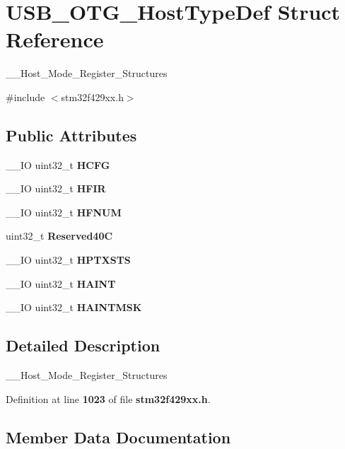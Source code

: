 \section{U\+S\+B\+\_\+\+O\+T\+G\+\_\+\+Host\+Type\+Def Struct Reference}
\label{structUSB__OTG__HostTypeDef}


\+\_\+\+\_\+\+Host\+\_\+\+Mode\+\_\+\+Register\+\_\+\+Structures  




{\ttfamily \#include $<$stm32f429xx.\+h$>$}

\subsection*{Public Attributes}
\begin{DoxyCompactItemize}
\item 
\+\_\+\+\_\+\+IO uint32\+\_\+t \textbf{ H\+C\+FG}
\item 
\+\_\+\+\_\+\+IO uint32\+\_\+t \textbf{ H\+F\+IR}
\item 
\+\_\+\+\_\+\+IO uint32\+\_\+t \textbf{ H\+F\+N\+UM}
\item 
uint32\+\_\+t \textbf{ Reserved40C}
\item 
\+\_\+\+\_\+\+IO uint32\+\_\+t \textbf{ H\+P\+T\+X\+S\+TS}
\item 
\+\_\+\+\_\+\+IO uint32\+\_\+t \textbf{ H\+A\+I\+NT}
\item 
\+\_\+\+\_\+\+IO uint32\+\_\+t \textbf{ H\+A\+I\+N\+T\+M\+SK}
\end{DoxyCompactItemize}


\subsection{Detailed Description}
\+\_\+\+\_\+\+Host\+\_\+\+Mode\+\_\+\+Register\+\_\+\+Structures 

Definition at line \textbf{ 1023} of file \textbf{ stm32f429xx.\+h}.



\subsection{Member Data Documentation}
\mbox{\label{structUSB__OTG__HostTypeDef_a9fb9e43255829e50b9e5416d58ae11be}} 
